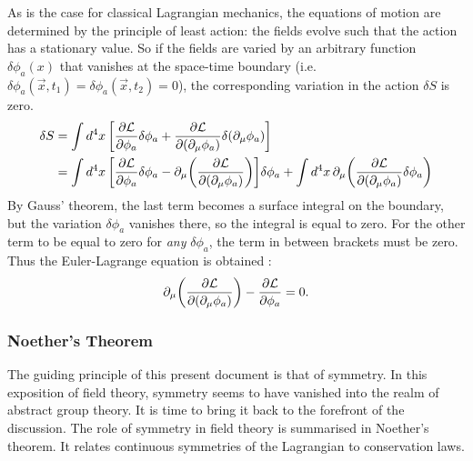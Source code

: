 As is the case for classical Lagrangian mechanics, the equations of motion are determined by the principle of least action: the fields evolve such that the action has a stationary value. So if the fields are varied by an arbitrary function $\delta\phi_a(x)$ that vanishes at the space-time boundary (i.e. $\delta\phi_a(\Vec{x},t_1)=\delta\phi_a(\Vec{x},t_2)=0$), the corresponding variation in the action $\delta S$ is zero.
\begin{align*}
    \delta S &= \int\dd{^4x}\qty[\pdv{\mathcal{L}}{\phi_a}\delta\phi_a+\pdv{\mathcal{L}}{(\partial_\mu \phi_a)}\delta(\partial_\mu\phi_a)]\\
    &=\int \dd{^4x}\qty[\pdv{\mathcal{L}}{\phi_a}\delta\phi_a-\partial_\mu\qty(\pdv{\mathcal{L}}{(\partial_\mu \phi_a)})]\delta\phi_a+\int\dd{^4x}\partial_\mu\qty(\pdv{\mathcal{L}}{(\partial_\mu\phi_a)}\delta\phi_a)
\end{align*}
By Gauss' theorem, the last term becomes a surface integral on the boundary, but the variation $\delta\phi_a$ vanishes there, so the integral is equal to zero. For the other term to be equal to zero for \textit{any} $\delta\phi_a$, the term in between brackets must be zero. Thus the Euler-Lagrange equation is obtained \cite{peskin_introduction_1995}:
\begin{equation}
    \partial_\mu\qty(\pdv{\mathcal{L}}{(\partial_\mu \phi_a)})-\pdv{\mathcal{L}}{\phi_a}=0.
\end{equation}
\subsubsection*{Noether's Theorem}

The guiding principle of this present document is that of symmetry. In this exposition of field theory, symmetry seems to have vanished into the realm of abstract group theory. It is time to bring it back to the forefront of the discussion. The role of symmetry in field theory is summarised in Noether's theorem. It relates continuous symmetries of the Lagrangian to conservation laws.

